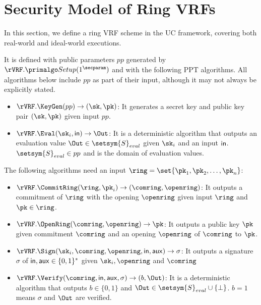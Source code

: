 
\section{Security Model  of Ring VRFs}
In this section, we define a ring VRF scheme in the UC framework, covering both real-world and ideal-world executions.

\begin{definition} \label{def:ringVRF}	It  is defined with public parameters $ pp $ generated by  $ \rVRF.\Setup(1^\secparam) $ and with the following  PPT algorithms. All algorithms below include $ pp $ as part of their input, although it may not always be explicitly stated.
	\begin{itemize}
		\item $ \rVRF.\KeyGen(pp) \rightarrow (\sk,\pk)$: It generates a secret key and public key pair $ (\sk,\pk) $ given input $ pp $.
		\item $ \rVRF.\Eval(\sk_i, \msg) \rightarrow \Out$: It is a deterministic algorithm that outputs an evaluation value $ \Out \in \setsym{S}_{eval}$ given  $ \sk_i $ and an input $ \mathsf{in} $. $ \setsym{S}_{eval} \in pp$ and is the domain  of  evaluation values.
	\end{itemize}
	The following algorithms need an input $ \ring = \set{\pk_1, \pk_2, \ldots, \pk_n}$:
	\begin{itemize}
		\item $ \rVRF.\CommitRing(\ring, \pk_i)  \rightarrow (\comring, \openring)$: It  outputs a commitment of $ \ring $ with the opening $ \openring $ given input  $ \ring $ and $ \pk \in \ring $.
		\item $ \rVRF.\OpenRing(\comring,\openring) \rightarrow \pk $: It  outputs a public key $ \pk  $ given commitment $ \comring $ and an opening $ \openring $ of $\comring$ to $\pk$.
		\item $ \rVRF.\Sign(\sk_i, \comring,\openring, \msg, \aux)\rightarrow \sigma$: It  outputs a  signature  $\sigma $  of  $ \mathsf{in}, \mathsf{aux} \in \{0,1\}^*$ given $ \sk_i, \openring $  and $ \comring $ 
		\item $ \rVRF.\Verify(\comring,\msg,\aux,\sigma) \rightarrow  (b, \Out)$: It is a deterministic  algorithm that outputs  $ b \in \{0,1\} $ and $ \Out \in\setsym{S}_{eval}\cup \{\perp\} $. $ b =1 $ means $ \sigma $ and $ \Out $ are verified.
	\end{itemize}
	
\end{definition}


